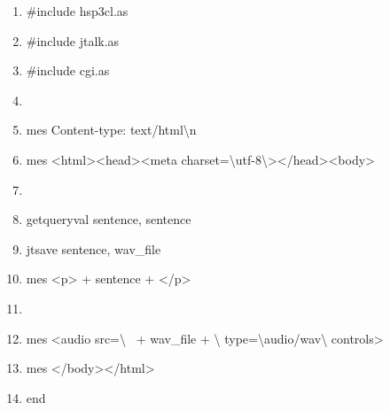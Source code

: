 \documentclass[a4paper,12pt,dvipdfmx]{jarticle}
\begin{document}
\begin{boxedminipage}{\textwidth}
	\begin{enumerate}
	\baselineskip 10pt
	\setlength{\itemsep}{0cm}
	\item \#include {\textquotedbl}hsp3cl.as{\textquotedbl}

	\item\#include {\textquotedbl}jtalk.as{\textquotedbl}

	\item\#include {\textquotedbl}cgi.as{\textquotedbl}

	\item

	\item mes {\textquotedbl}Content-type: text/html{\textbackslash}n{\textquotedbl}

	\item mes {\textquotedbl}{\textless}html{\textgreater}{\textless}head{\textgreater}{\textless}meta
	charset={\textbackslash}{\textquotedbl}utf-8{\textbackslash}{\textquotedbl}{\textgreater}{\textless}/head{\textgreater}{\textless}body{\textgreater}{\textquotedbl}


	\item

	\item getqueryval {\textquotedbl}sentence{\textquotedbl}, sentence

	\item jtsave sentence, wav\_file

	\item mes {\textquotedbl}{\textless}p{\textgreater}{\textquotedbl} + sentence +
	{\textquotedbl}{\textless}/p{\textgreater}{\textquotedbl}


	\item

	\item mes {\textquotedbl}{\textless}audio src={\textbackslash}{\textquotedbl}{\textquotedbl} \ + wav\_file +
	{\textquotedbl}{\textbackslash}{\textquotedbl}
	 type={\textbackslash}{\textquotedbl}audio/wav{\textbackslash}{\textquotedbl} controls{\textgreater}{\textquotedbl}

	\item mes {\textquotedbl}{\textless}/body{\textgreater}{\textless}/html{\textgreater}{\textquotedbl}

	\item end
	\end{enumerate}
\end{boxedminipage}
\flushleft
\end{document}
